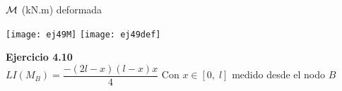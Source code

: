 ${\mathcal M}$ (kN.m) \hspace{0.4\textwidth} deformada
\begin{center}
	\texttt{[image: ej49M]}
	\texttt{[image: ej49def]}
\end{center}

\textbf{Ejercicio 4.10}\\

$LI(M_B)=\dfrac{-(2l-x)(l-x)x}{4}$
Con $x\in[0,\;l]$ medido desde el nodo $B$

%
%
%
%	
%
%
%
%
